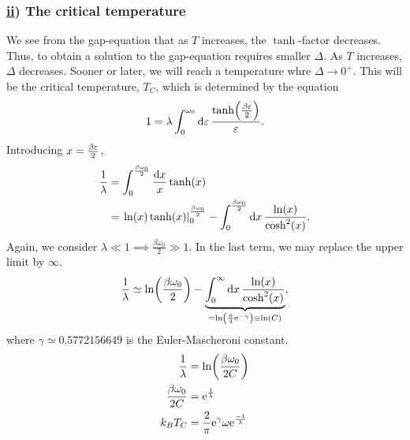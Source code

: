\subsubsection*{\underline{ii}) \quad The critical temperature}
We see from the gap-equation that as $T$ increases, the $\tanh$-factor decreases. Thus, to obtain a solution to the gap-equation requires smaller $\Delta$. As $T$ increases, $\Delta$ decreases. Sooner or later, we will reach a temperature whre $\Delta\rightarrow0^+$. This will be the critical temperature, $T_C$, which is determined by the equation 
\begin{equation} 
1=\lambda\int_0^{\omega_0}\dd{\varepsilon}\frac{\tanh(\frac{\beta \varepsilon}{2})}{\varepsilon}.
\end{equation}
Introducing $x = \frac{\beta\varepsilon}{2}$, 
\begin{align*} 
\frac{1}{\lambda} &= \int_{0}^{\frac{\beta\omega_0}{2}}\frac{\dd{x}}{x}\tanh(x) \\
&= \left.\ln(x)\tanh(x)\right|_{0}^{\frac{\beta\omega_0}{2}} - \int_{0}^{\frac{\beta\omega_0}{2}}\dd{x}\frac{\ln(x)}{\cosh[2](x)}.
\end{align*}
Again, we consider $\lambda \ll 1 \implies \frac{\beta\omega_0}{2} \gg 1$. In the last term, we may replace the upper limit by $\infty$.
\begin{equation} 
\frac{1}{\lambda}\simeq \ln(\frac{\beta\omega_0}{2}) - \underbrace{\int_{0}^{\infty}\dd{x}\frac{\ln(x)}{\cosh[2](x)}}_{=\ln(\frac{\pi}{4}\mathrm{e}^{-\gamma}) \equiv \ln(C)},
\end{equation}
where $\gamma \simeq 0.5772156649$ is the Euler-Mascheroni constant.
\begin{align} 
\frac{1}{\lambda} &= \ln(\frac{\beta\omega_0}{2C}) \\
\frac{\beta\omega_0}{2C} &= \mathrm{e}^{\frac{1}{\lambda}} \\ 
k_B T_C &= \frac{2}{\pi}\mathrm{e}^{\gamma}\omega\mathrm{e}^{\frac{-1}{\lambda}}
\end{align}

